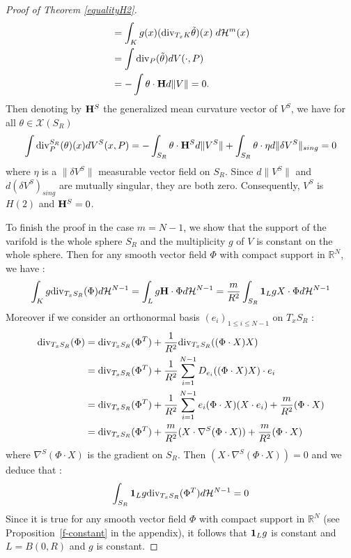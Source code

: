 \documentclass[12pt,english]{smfart} %
\theoremstyle{remark}
\newcommand{\R}{\mathbb{R}}
\newcommand{\Hm}{{\bf H}}
\begin{document}
\begin{proof}[Proof of Theorem \ref{equalityH2}]
\begin{align*}
&=\int_{K}g(x)({\rm div}_{T_xK}\tilde{\theta})(x) \;d\mathcal{H}^m(x)\\
&=\int{\rm div}_P(\tilde{\theta})dV(\cdot,P)\\
&=-\int\theta\cdot\Hm d\|V\|=0.
\end{align*}
Then denoting by $\Hm^S$ the generalized mean curvature vector of $V^S$, we have for all $\theta\in\mathcal{X}(S_R)$ 
$$\int{\rm div}^{S_R}_P(\theta)(x)dV^S(x,P)=-\int_{S_R}\theta\cdot\Hm^Sd\|V^S\|+\int_{S_R}\theta\cdot\eta d\|\delta V^S\|_{sing}=0$$
where $\eta$ is a $\|\delta V^S\|$ measurable vector field on $S_R$. Since $d\|V^S\|$ and $d(\delta V^S)_{sing}$ are mutually singular, they are both zero. Consequently, $V^S$ is $H(2)$ and $\Hm^S=0$. 

To finish the proof in the case $m=N-1$, we show  that the support of the varifold is the whole sphere $S_R$ and the multiplicity $g$ of  $V$ is constant on the whole sphere. Then for any smooth vector field $\Phi$ with compact support in $\R^N$, we have :
$$\int_K g{\rm div}_{T_xS_R}(\Phi)d\mathcal H^{N-1}=\int_L g\Hm\cdot\Phi d\mathcal H^{N-1}=\frac{m}{R^2}\int_{S_R}{\bf 1}_L g X\cdot\Phi d\mathcal H^{N-1}$$
Moreover if we consider an orthonormal basis $(e_i)_{1\leqslant i\leqslant N-1}$ on $T_xS_R$ :
\begin{align*}
{\rm div}_{T_xS_R}(\Phi)&={\rm div}_{T_xS_R}(\Phi^T)+\frac{1}{R^2}{\rm div}_{T_xS_R}((\Phi\cdot X)X)\\
&={\rm div}_{T_xS_R}(\Phi^T)+\frac{1}{R^2}\sum_{i=1}^{N-1}D_{e_i}((\Phi\cdot X)X)\cdot e_i\\
&={\rm div}_{T_xS_R}(\Phi^T)+\frac{1}{R^2}\sum_{i=1}^{N-1}e_i(\Phi\cdot X)(X\cdot e_i)+\frac{m}{R^2}(\Phi\cdot X)\\
&={\rm div}_{T_xS_R}(\Phi^T)+\frac{m}{R^2}(X\cdot\nabla^S(\Phi\cdot X))+\frac{m}{R^2}(\Phi\cdot X)
\end{align*}
where $\nabla^S(\Phi\cdot X)$ is the gradient on $S_R$. Then $(X\cdot\nabla^S(\Phi\cdot X))=0$ and we deduce that :
$$\int_{S_R}{\bf 1}_L g{\rm div}_{T_xS_R}(\Phi^T)d\mathcal H^{N-1}=0$$
Since it is true for any smooth vector field $\Phi$ with compact support in $\R^N$ (see Proposition~\ref{f-constant} in the appendix), it follows that ${\bf 1}_L g$ is constant and $L=B(0,R)$ and $g$ is constant.
\end{proof}
\end{document}
